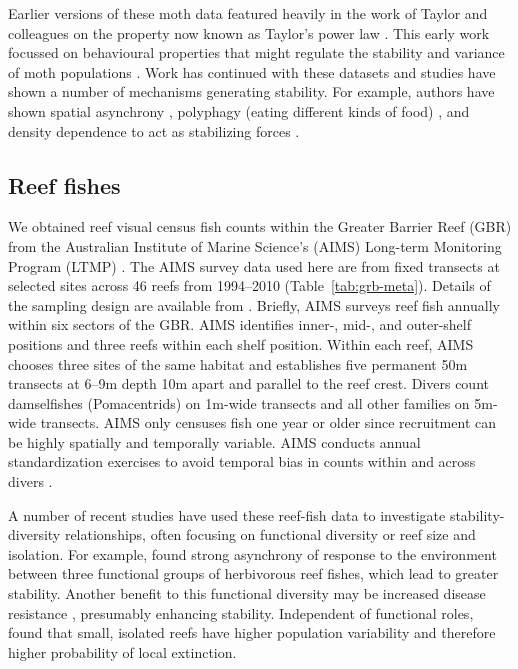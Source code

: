 Earlier versions of these moth data featured heavily in the work of
Taylor and colleagues on the property now known as Taylor's power law
\citep{taylor1977, taylor1980, perry1981}. This early work
focussed on behavioural properties that might regulate the stability and
variance of moth populations \citep{taylor1980}. Work has continued with
these datasets and studies have shown a number of mechanisms generating
stability. For example, authors have shown spatial asynchrony
\citep{gaston1988}, polyphagy (eating different kinds of food)
\citep{redfearn1988}, and density dependence to act as stabilizing forces
\citep{hanski1993}.

\subsection{Reef fishes}

We obtained reef visual census fish counts within the Greater Barrier Reef
(GBR) from the Australian Institute of Marine Science's (AIMS) Long-term
Monitoring Program (LTMP) \citep{sweatman2008}. The AIMS survey data used
here are from fixed transects at selected sites across 46 reefs from
1994--2010 (Table~\ref{tab:grb-meta}). Details of the sampling design are
available from \citet{halford1994}. Briefly, AIMS surveys reef fish
annually within six sectors of the GBR. AIMS identifies inner-, \mbox{mid-,}
and outer-shelf positions and three reefs within each shelf position. Within
each reef, AIMS chooses three sites of the same habitat and establishes five
permanent 50m transects at 6--9m depth 10m apart and parallel to the reef
crest. Divers count damselfishes (Pomacentrids) on 1m-wide transects and all
other families on 5m-wide transects. AIMS only censuses fish one year or older
since recruitment can be highly spatially and temporally variable. AIMS
conducts annual standardization exercises to avoid temporal bias in counts
within and across divers \citep{halford1994}.

A number of recent studies have used these reef-fish data to
investigate stability-diversity relationships, often focusing on functional
diversity or reef size and isolation. For example, \citet{thibaut2012}
found strong asynchrony of response to the environment between three functional
groups of herbivorous reef fishes, which lead to greater stability. Another
benefit to this functional diversity may be increased disease resistance
\citep{raymundo2009}, presumably enhancing stability. Independent of
functional roles, \citet{mellin2010} found that small, isolated reefs have
higher population variability and therefore higher probability of local
extinction.

